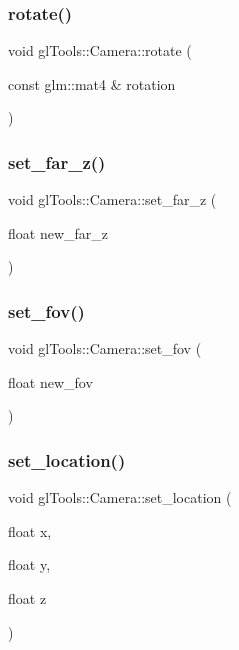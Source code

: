 \mbox{\label{classgl_tools_1_1_camera_a20aed75dc4ab1d0e14f85dd256effc5c}} 
\subsubsection{rotate()}
{\footnotesize\ttfamily void gl\+Tools\+::\+Camera\+::rotate (\begin{DoxyParamCaption}\item[{const glm\+::mat4 \&}]{rotation }\end{DoxyParamCaption})\hspace{0.3cm}{\ttfamily [inline]}}

\mbox{\label{classgl_tools_1_1_camera_a402677a514a44b9bf2c6aa0bd32c2b7d}} 
\subsubsection{set\_far\_z()}
{\footnotesize\ttfamily void gl\+Tools\+::\+Camera\+::set\+\_\+far\+\_\+z (\begin{DoxyParamCaption}\item[{float}]{new\+\_\+far\+\_\+z }\end{DoxyParamCaption})\hspace{0.3cm}{\ttfamily [inline]}}

\mbox{\label{classgl_tools_1_1_camera_aba4738b5841fbfe8c310d2e2cfb161ff}} 
\subsubsection{set\_fov()}
{\footnotesize\ttfamily void gl\+Tools\+::\+Camera\+::set\+\_\+fov (\begin{DoxyParamCaption}\item[{float}]{new\+\_\+fov }\end{DoxyParamCaption})\hspace{0.3cm}{\ttfamily [inline]}}

\mbox{\label{classgl_tools_1_1_camera_a802e84473e3b2aa28490745b2a3cb8ab}} 
\subsubsection{set\_location()}
{\footnotesize\ttfamily void gl\+Tools\+::\+Camera\+::set\+\_\+location (\begin{DoxyParamCaption}\item[{float}]{x,  }\item[{float}]{y,  }\item[{float}]{z }\end{DoxyParamCaption})\hspace{0.3cm}{\ttfamily [inline]}}

